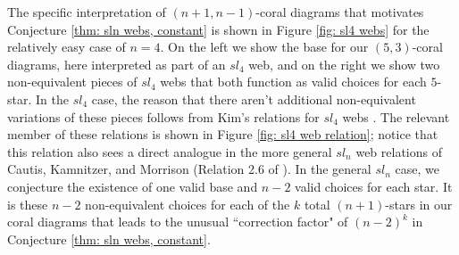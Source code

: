 \documentclass[documentfleqn,12pt]{amsart}
\begin{document}
The specific interpretation of $(n+1,n-1)$-coral diagrams that motivates Conjecture \ref{thm: sln webs, constant} is shown in Figure \ref{fig: sl4 webs} for the relatively easy case of $n=4$.  On the left we show the base for our $(5,3)$-coral diagrams, here interpreted as part of an $sl_4$ web, and on the right we show two non-equivalent pieces of $sl_4$ webs that both function as valid choices for each $5$-star.  In the $sl_4$ case, the reason that there aren't additional non-equivalent variations of these pieces follows from Kim's relations for $sl_4$ webs \cite{Kim}.  The relevant member of these relations is shown in Figure \ref{fig: sl4 web relation}; notice that this relation also sees a direct analogue in the more general $sl_n$ web relations of Cautis, Kamnitzer, and Morrison (Relation 2.6 of \cite{CKM}).  In the general $sl_n$ case, we conjecture the existence of one valid base and $n-2$ valid choices for each star.  It is these $n-2$ non-equivalent choices for each of the $k$ total $(n+1)$-stars in our coral diagrams that leads to the unusual ``correction factor" of $(n-2)^k$ in Conjecture \ref{thm: sln webs, constant}.
\end{document}
